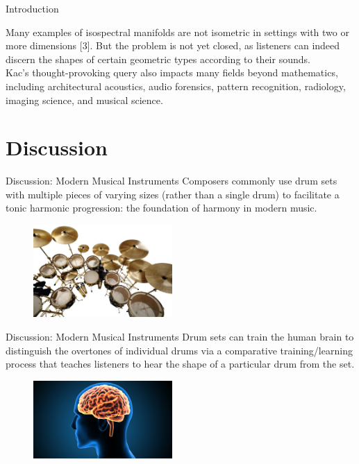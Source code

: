 \documentclass[aspectratio=169,xcolor=dvipsnames]{beamer}
\begin{document}
\begin{frame}{Introduction}
\begin{small}
    Many examples of isospectral manifolds are not isometric in settings with two or more dimensions [3]. But the problem is not yet closed, as listeners can indeed discern the shapes of certain geometric types according to their sounds.\\
\vspace{1.5em}
Kac's thought-provoking query also impacts many fields beyond mathematics, including architectural acoustics, audio forensics, pattern recognition, radiology, imaging science, and musical science.
\end{small}
\end{frame}

\section{Discussion}

\begin{frame}{Discussion: Modern Musical Instruments}
    Composers commonly use drum sets with multiple pieces of varying sizes (rather than a single drum) to facilitate a tonic harmonic progression: the foundation of harmony in modern music. 
    \begin{figure}[!ht]
\label{drum}
 \centering
 \includegraphics[width=150pt]{images/drum.jpeg}
 \end{figure}
\end{frame}


\begin{frame}{Discussion: Modern Musical Instruments}
    Drum sets can train the human brain to distinguish the overtones of individual drums via a comparative training/learning process that teaches listeners to hear the shape of a particular drum from the set.
    \begin{figure}[!ht]
\label{brain}
 \centering
 \includegraphics[width=150pt]{images/brain.jpeg}
 \end{figure}
\end{frame}
\end{document}
